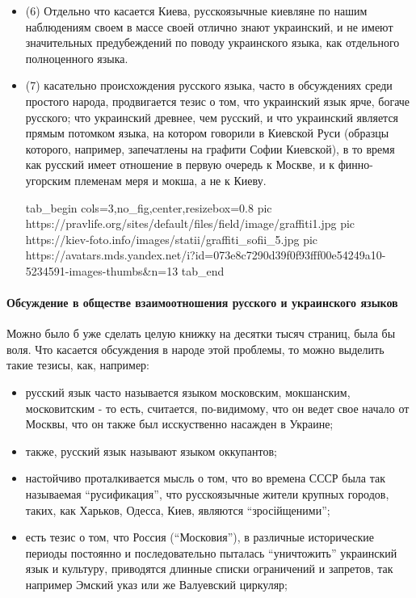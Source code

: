 \begin{itemize}
\item (6) Отдельно что касается Киева, русскоязычные киевляне по нашим
наблюдениям своем в массе своей отлично знают украинский, и не имеют
значительных предубеждений по поводу украинского языка, как отдельного
полноценного языка.

\item (7) касательно происхождения русского языка, часто в обсуждениях среди
простого народа, продвигается тезис о том, что украинский язык ярче, богаче
русского; что украинский древнее, чем русский, и что украинский является прямым
потомком языка, на котором говорили в Киевской Руси (образцы которого,
например, запечатлены на графити Софии Киевской), в то время как русский имеет
отношение в первую очередь к Москве, и к финно-угорским племенам меря и мокша,
а не к Киеву.

\ifcmt
  tab_begin cols=3,no_fig,center,resizebox=0.8
     pic https://pravlife.org/sites/default/files/field/image/graffiti1.jpg
     pic https://kiev-foto.info/images/statii/graffiti_sofii_5.jpg
     pic https://avatars.mds.yandex.net/i?id=073e8c7290d39f0f93fff00e54249a10-5234591-images-thumbs&n=13
  tab_end
\fi

\end{itemize} %

\paragraph{Обсуждение в обществе взаимоотношения русского и украинского языков}

Можно было б уже сделать целую книжку на десятки тысяч страниц, была бы воля.
Что касается обсуждения в народе этой проблемы, то можно выделить такие тезисы,
как, например:

\begin{itemize} %
\item русский язык часто называется языком московским, мокшанским, московитским - то есть, считается, по-видимому,
что он ведет свое начало от Москвы, что он также был исскуственно насажден в Украине;
\item также, русский язык называют языком оккупантов;
\item настойчиво проталкивается мысль о том, что во времена СССР была так
называемая \enquote{русификация}, что русскоязычные жители крупных городов,
таких, как Харьков, Одесса, Киев, являются \enquote{зросійщеними};
\item есть тезис о том, что Россия (\enquote{Московия}), в различные
исторические периоды постоянно и последовательно пыталась
\enquote{уничтожить} украинский язык и культуру, приводятся длинные
списки ограничений и запретов, так например Эмский указ или же
Валуевский циркуляр;
\end{itemize} %

